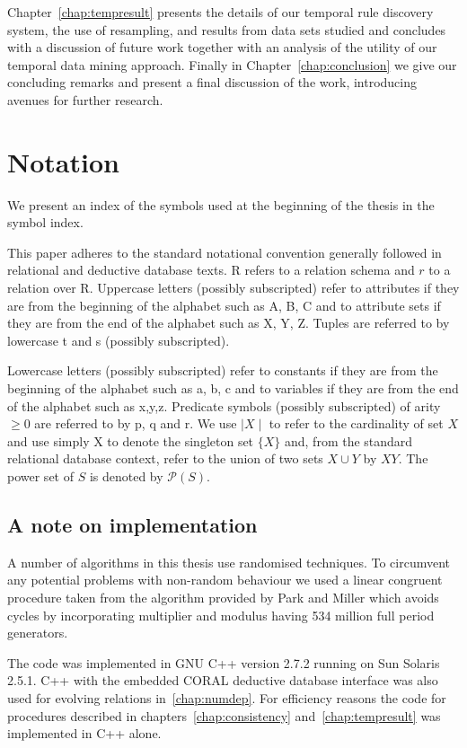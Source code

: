 \medskip

Chapter~\ref{chap:tempresult} presents the details of our temporal
rule discovery system, the use of resampling, and results from data
sets studied and concludes with a discussion of future work together
with an analysis of the utility of our temporal data mining approach.
Finally in Chapter~\ref{chap:conclusion} we give our concluding
remarks and present a final discussion of the work, introducing
avenues for further research.


\section{Notation}

We present an index of the symbols used at the beginning of the thesis
in the symbol index.

\smallskip

This paper adheres to the standard notational convention generally followed in
relational and deductive database texts.  R refers to a relation
schema and $r$ to a relation over R.  Uppercase letters (possibly
subscripted) refer to attributes if they are from the beginning of the
alphabet such as A, B, C and to attribute sets if they are from the
end of the alphabet such as X, Y, Z.  Tuples are referred to by
lowercase t and s (possibly subscripted).

\medskip

Lowercase letters (possibly subscripted) refer to constants if they are from the beginning of the alphabet such as a, b, c and to variables if they are from the end of the alphabet such as x,y,z.  Predicate symbols (possibly subscripted) of arity $\ge 0$ are referred to by
p, q and r. 
We use $\mid X \mid$ to refer to the cardinality of set $X$ and use simply
X to denote the singleton set $\{ X \}$ and, from the standard
relational database context, refer to the union of
two sets $X \cup Y$ by $XY$. The power set of $S$ is
denoted by $\mathcal{P}(S)$. 

\subsection{A note on implementation}

A number of algorithms in this thesis use randomised techniques. To
circumvent any potential problems with non-random behaviour we used
a linear congruent procedure taken
from the algorithm provided by Park and Miller \cite{pm88} which
avoids cycles by incorporating multiplier and modulus
having 534 million full period generators. 

\smallskip
The code was implemented in GNU C++ version 2.7.2 running
on Sun Solaris 2.5.1.  C++ with
the embedded CORAL deductive
database interface \cite{rss92} was also used for evolving relations
in~\ref{chap:numdep}. For efficiency reasons the code for procedures
described in chapters~\ref{chap:consistency} and~\ref{chap:tempresult}
was implemented in C++ alone.


